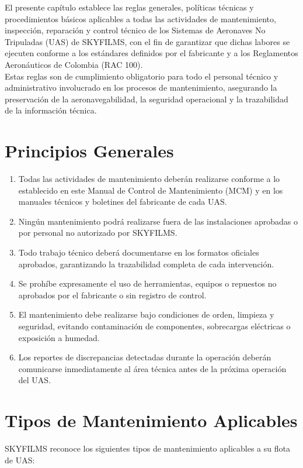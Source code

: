 El presente capítulo establece las reglas generales, políticas técnicas y procedimientos básicos aplicables a todas las actividades de mantenimiento, inspección, reparación y control técnico de los Sistemas de Aeronaves No Tripuladas (UAS) de SKYFILMS, con el fin de garantizar que dichas labores se ejecuten conforme a los estándares definidos por el fabricante y a los Reglamentos Aeronáuticos de Colombia (RAC 100).\\

Estas reglas son de cumplimiento obligatorio para todo el personal técnico y administrativo involucrado en los procesos de mantenimiento, asegurando la preservación de la aeronavegabilidad, la seguridad operacional y la trazabilidad de la información técnica.

\section{Principios Generales}

\begin{enumerate}
    \item Todas las actividades de mantenimiento deberán realizarse conforme a lo establecido en este Manual de Control de Mantenimiento (MCM) y en los manuales técnicos y boletines del fabricante de cada UAS.

    \item Ningún mantenimiento podrá realizarse fuera de las instalaciones aprobadas o por personal no autorizado por SKYFILMS.

    \item Todo trabajo técnico deberá documentarse en los formatos oficiales aprobados, garantizando la trazabilidad completa de cada intervención.

    \item Se prohíbe expresamente el uso de herramientas, equipos o repuestos no aprobados por el fabricante o sin registro de control.

    \item El mantenimiento debe realizarse bajo condiciones de orden, limpieza y seguridad, evitando contaminación de componentes, sobrecargas eléctricas o exposición a humedad.

    \item Los reportes de discrepancias detectadas durante la operación deberán comunicarse inmediatamente al área técnica antes de la próxima operación del UAS.
\end{enumerate}

\section{Tipos de Mantenimiento Aplicables}
SKYFILMS reconoce los siguientes tipos de mantenimiento aplicables a su flota de UAS:

